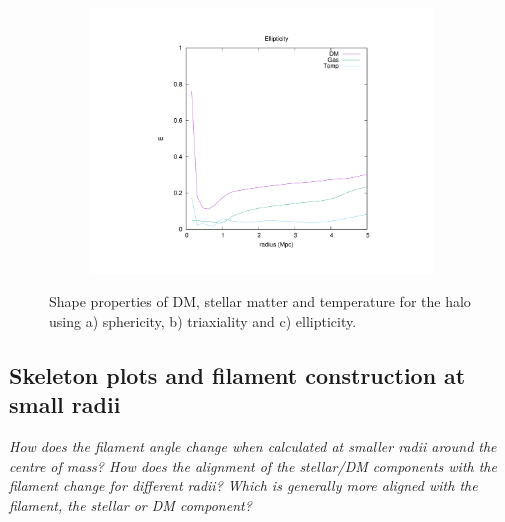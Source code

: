 \documentclass[journal]{IEEEtran}
\begin{document}
\begin{figure}[!t]
\begin{subfigure}[t]{0.3\textwidth}
		\includegraphics[width=\linewidth]{Ellipticity.pdf}
	\end{subfigure}
\label{fig:shapes}
	\caption{Shape properties of DM, stellar matter and temperature for the halo using a) sphericity, b) triaxiality and c) ellipticity.}
\end{figure}

\subsection{Skeleton plots and filament construction at small radii}
\textit{How does the filament angle change when calculated at smaller radii around the centre of mass?
How does the alignment of the stellar/DM components with the filament change for different radii?
Which is generally more aligned with the filament, the stellar or DM component?}
\end{document}
